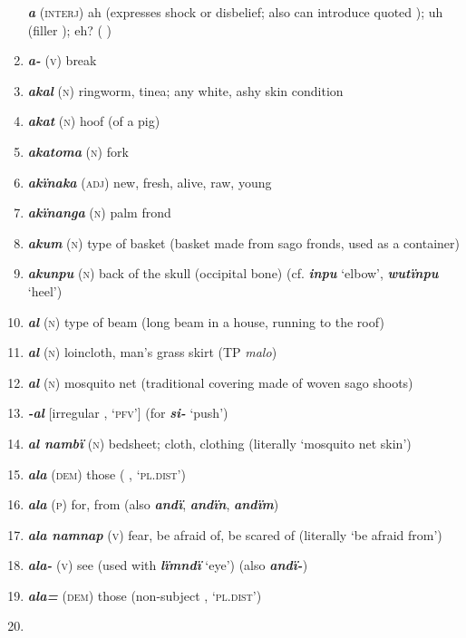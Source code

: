 \begin{enumerate}[noitemsep, label={}, align=left, widest=190, labelsep=1ex,leftmargin=*,itemindent=-10pt]
\textbf{\textit{a}} (\textsc{interj}) ah (expresses shock or disbelief; also can introduce quoted ); uh (filler ); eh? ( ) \item
\textbf{\textit{a-}} (\textsc{v}) break \item
\textbf{\textit{akal}} (\textsc{n}) ringworm, tinea; any white, ashy skin condition \item
\textbf{\textit{akat}} (\textsc{n}) hoof (of a pig) \item
\textbf{\textit{akatoma}} (\textsc{n}) fork \item
\textbf{\textit{akïnaka}} (\textsc{adj}) new, fresh, alive, raw, young \item
\textbf{\textit{akïnanga}} (\textsc{n}) palm frond \item
\textbf{\textit{akum}} (\textsc{n}) type of basket (basket made from sago fronds, used as a container) \item
\textbf{\textit{akunpu}} (\textsc{n}) back of the skull (occipital bone) (cf. \textbf{\textit{inpu}} ‘elbow’, \textbf{\textit{wutïnpu}} ‘heel’) \item
\textbf{\textit{al}} (\textsc{n}) type of beam (long beam in a house, running to the roof) \item
\textbf{\textit{al}} (\textsc{n}) loincloth, man’s grass skirt (TP \textit{malo}) \item
\textbf{\textit{al}} (\textsc{n}) mosquito net (traditional covering made of woven sago shoots) \item
\textbf{\textit{-al}} [irregular  , ‘\textsc{pfv}’] (for \textbf{\textit{si-}} ‘push’)
\item \textbf{\textit{al nambï}} (\textsc{n}) bedsheet; cloth, clothing (literally ‘mosquito net skin’) \item
\textbf{\textit{ala}} (\textsc{dem}) those (  , ‘\textsc{pl.dist}’) \item
\textbf{\textit{ala}} (\textsc{p}) for, from (also \textbf{\textit{andï}}, \textbf{\textit{andïn}}, \textbf{\textit{andïm}}) \item
\textbf{\textit{ala namnap}} (\textsc{v}) fear, be afraid of, be scared of (literally ‘be afraid from’) \item
\textbf{\textit{ala-}} (\textsc{v}) see (used with \textbf{\textit{lïmndï}} ‘eye’) (also \textbf{\textit{andï-}}) \item
\textbf{\textit{ala=}} (\textsc{dem}) those (non-subject   , ‘\textsc{pl.dist}’) \item 

\end{enumerate}

